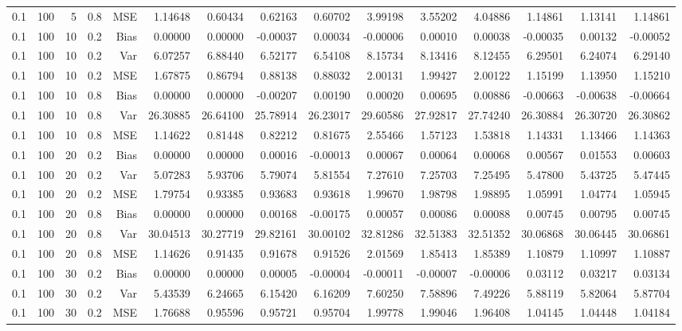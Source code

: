 \begin{table}[!htbp]
\begin{tabular}{lrrrrrrrrrrrrrr}
0.1 & 100 &  5 & 0.8 & MSE & 1.14648 & 0.60434 & 0.62163 & 0.60702 & 3.99198 & 3.55202 & 4.04886 & 1.14861 & 1.13141 & 1.14861 \\
0.1 & 100 & 10 & 0.2 & Bias & 0.00000 & 0.00000 & -0.00037 & 0.00034 & -0.00006 & 0.00010 & 0.00038 & -0.00035 & 0.00132 & -0.00052 \\
0.1 & 100 & 10 & 0.2 & Var & 6.07257 & 6.88440 & 6.52177 & 6.54108 & 8.15734 & 8.13416 & 8.12455 & 6.29501 & 6.24074 & 6.29140 \\
0.1 & 100 & 10 & 0.2 & MSE & 1.67875 & 0.86794 & 0.88138 & 0.88032 & 2.00131 & 1.99427 & 2.00122 & 1.15199 & 1.13950 & 1.15210 \\
0.1 & 100 & 10 & 0.8 & Bias & 0.00000 & 0.00000 & -0.00207 & 0.00190 & 0.00020 & 0.00695 & 0.00886 & -0.00663 & -0.00638 & -0.00664 \\
0.1 & 100 & 10 & 0.8 & Var & 26.30885 & 26.64100 & 25.78914 & 26.23017 & 29.60586 & 27.92817 & 27.74240 & 26.30884 & 26.30720 & 26.30862 \\
0.1 & 100 & 10 & 0.8 & MSE & 1.14622 & 0.81448 & 0.82212 & 0.81675 & 2.55466 & 1.57123 & 1.53818 & 1.14331 & 1.13466 & 1.14363 \\
0.1 & 100 & 20 & 0.2 & Bias & 0.00000 & 0.00000 & 0.00016 & -0.00013 & 0.00067 & 0.00064 & 0.00068 & 0.00567 & 0.01553 & 0.00603 \\
0.1 & 100 & 20 & 0.2 & Var & 5.07283 & 5.93706 & 5.79074 & 5.81554 & 7.27610 & 7.25703 & 7.25495 & 5.47800 & 5.43725 & 5.47445 \\
0.1 & 100 & 20 & 0.2 & MSE & 1.79754 & 0.93385 & 0.93683 & 0.93618 & 1.99670 & 1.98798 & 1.98895 & 1.05991 & 1.04774 & 1.05945 \\
0.1 & 100 & 20 & 0.8 & Bias & 0.00000 & 0.00000 & 0.00168 & -0.00175 & 0.00057 & 0.00086 & 0.00088 & 0.00745 & 0.00795 & 0.00745 \\
0.1 & 100 & 20 & 0.8 & Var & 30.04513 & 30.27719 & 29.82161 & 30.00102 & 32.81286 & 32.51383 & 32.51352 & 30.06868 & 30.06445 & 30.06861 \\
0.1 & 100 & 20 & 0.8 & MSE & 1.14626 & 0.91435 & 0.91678 & 0.91526 & 2.01569 & 1.85413 & 1.85389 & 1.10879 & 1.10997 & 1.10887 \\
0.1 & 100 & 30 & 0.2 & Bias & 0.00000 & 0.00000 & 0.00005 & -0.00004 & -0.00011 & -0.00007 & -0.00006 & 0.03112 & 0.03217 & 0.03134 \\
0.1 & 100 & 30 & 0.2 & Var & 5.43539 & 6.24665 & 6.15420 & 6.16209 & 7.60250 & 7.58896 & 7.49226 & 5.88119 & 5.82064 & 5.87704 \\
0.1 & 100 & 30 & 0.2 & MSE & 1.76688 & 0.95596 & 0.95721 & 0.95704 & 1.99778 & 1.99046 & 1.96408 & 1.04145 & 1.04448 & 1.04184 \\

\end{tabular}
\end{table}
